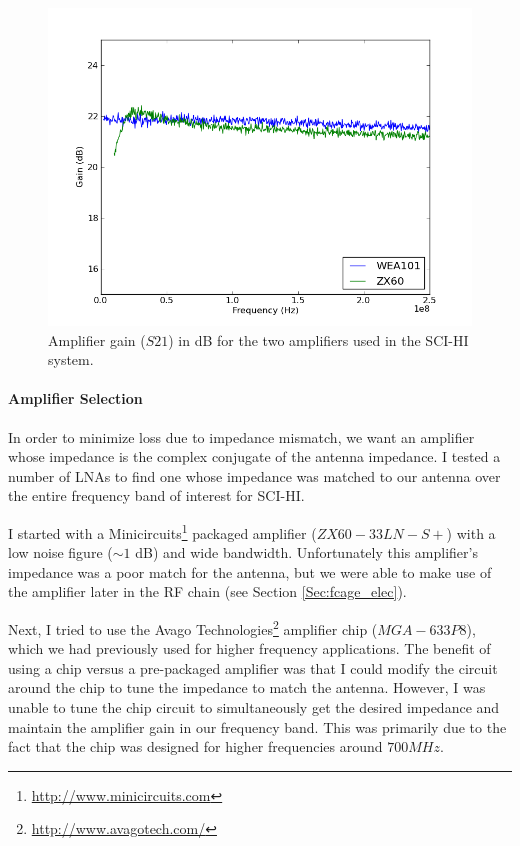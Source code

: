 \begin{figure}[htb]
\begin{center}
\includegraphics[width=0.9\linewidth]{SCIHI_system/figures/amp_Gain_dB.png}
\caption{Amplifier gain ($S21$) in dB for the two amplifiers used in the SCI-HI system. }
\label{Fig:amp_gain}
\end{center}
\end{figure}

\paragraph{Amplifier Selection}

In order to minimize loss due to impedance mismatch, we want an amplifier whose impedance is the complex conjugate of the antenna impedance. I tested a number of LNAs to find one whose impedance was matched to our antenna over the entire frequency band of interest for SCI-HI. 

I started with a Minicircuits\footnote{\url{http://www.minicircuits.com}} packaged amplifier ($ZX60 - 33 LN - S+$) with a low noise figure ($\sim 1$ dB) and wide bandwidth. Unfortunately this amplifier's impedance was a poor match for the antenna, but we were able to make use of the amplifier later in the RF chain (see Section \ref{Sec:fcage_elec}). 

Next, I tried to use the Avago Technologies\footnote{\url{http://www.avagotech.com/}} amplifier chip ($MGA-633P8$), which we had previously used for higher frequency applications. The benefit of using a chip versus a pre-packaged amplifier was that I could modify the circuit around the chip to tune the impedance to match the antenna. However, I was unable to tune the chip circuit to simultaneously get the desired impedance and maintain the amplifier gain in our frequency band. This was primarily due to the fact that the chip was designed for higher frequencies around $700 MHz$. 

